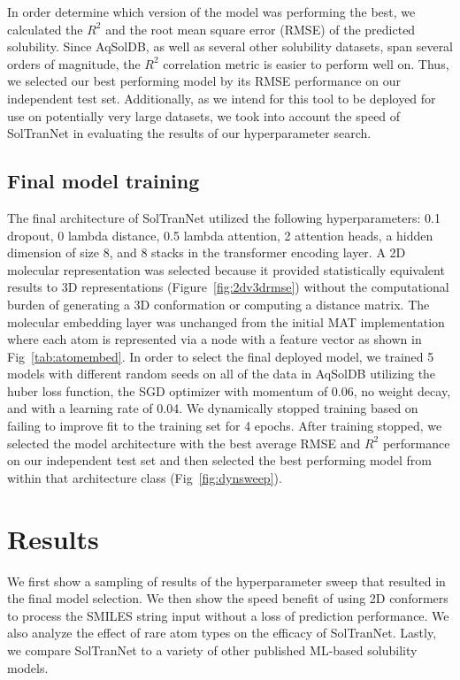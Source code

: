 \documentclass[journal=jmcmar,manuscript=article]{achemso}
\begin{document}
In order determine which version of the model was performing the best, we calculated the $R^2$ and the root mean square error (RMSE) of the predicted solubility.
Since AqSolDB, as well as several other solubility datasets, span several orders of magnitude, the $R^2$ correlation metric is easier to perform well on.
Thus, we selected our best performing model by its RMSE performance on our independent test set.
Additionally, as we intend for this tool to be deployed for use on potentially very large datasets, we took into account the speed of SolTranNet in evaluating the results of our hyperparameter search. 

\subsection{Final model training}
The final architecture of SolTranNet utilized the following hyperparameters: 0.1 dropout, 0 lambda distance, 0.5 lambda attention, 2 attention heads, a hidden dimension of size 8, and 8 stacks in the transformer encoding layer. A 2D molecular representation was selected because it provided statistically equivalent results to 3D representations (Figure~\ref{fig:2dv3drmse}) without the computational burden of generating a 3D conformation or computing a distance matrix.
The molecular embedding layer was unchanged from the initial MAT implementation\cite{MAT} where each atom is represented via a node with a feature vector as shown in Fig~\ref{tab:atomembed}.
In order to select the final deployed model, we trained 5 models with different random seeds on all of the data in AqSolDB utilizing the huber loss function, the SGD optimizer with momentum of 0.06, no weight decay, and with a learning rate of 0.04.
We dynamically stopped training based on failing to improve fit to the training set for 4 epochs.
After training stopped, we selected the model architecture with the best average RMSE and $R^2$ performance on our independent test set and then selected the best performing model from within that architecture class (Fig~\ref{fig:dynsweep}).

\section{Results}

We first show a sampling of results of the hyperparameter sweep that resulted in the final model selection.
We then show the speed benefit of using 2D conformers to process the SMILES string input without a loss of prediction performance.
We also analyze the effect of rare atom types on the efficacy of SolTranNet.
Lastly, we compare SolTranNet to a variety of other published ML-based solubility models.
\end{document}
